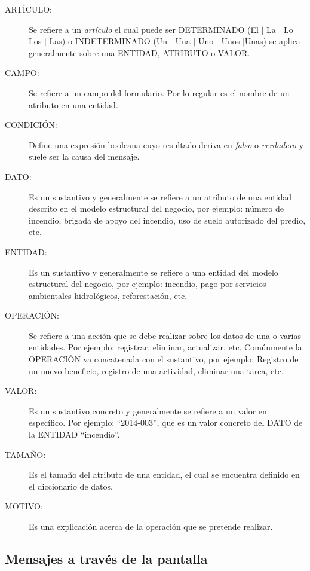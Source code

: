     \begin{description}
	\item [ARTÍCULO:] Se refiere a un {\em artículo} el cual puede ser DETERMINADO (El $\mid$ La $\mid$ Lo $\mid$ Los $\mid$ Las) o INDETERMINADO (Un $\mid$ Una $\mid$ 
	Uno $\mid$ Unos $\mid$Unas) se aplica generalmente sobre una ENTIDAD, ATRIBUTO o VALOR.
	\item [CAMPO:] Se refiere a un campo del formulario. Por lo regular es el nombre de un atributo en una entidad.
	\item [CONDICIÓN:] Define una expresión booleana cuyo resultado deriva en {\em falso} o {\em verdadero} y suele ser la causa del mensaje.
	\item [DATO:] Es un sustantivo y generalmente se refiere a un atributo de una entidad descrito en el modelo estructural del negocio, por ejemplo: número de incendio,
	brigada de apoyo del incendio, uso de suelo autorizado del predio, etc. %
	\item [ENTIDAD:] Es un sustantivo y generalmente se refiere a una entidad del modelo estructural del negocio, por ejemplo: incendio, pago por servicios ambientales hidrológicos, reforestación, etc.
	\item [OPERACIÓN:] Se refiere a una acción que se debe realizar sobre los datos de una o varias entidades. Por ejemplo: registrar, eliminar, actualizar, etc. Comúnmente 
	la OPERACIÓN va concatenada con el sustantivo, por ejemplo: Registro de un nuevo beneficio, registro de una actividad, eliminar una tarea, etc.
	\item [VALOR:] Es un sustantivo concreto y generalmente se refiere a un valor en específico. Por ejemplo: ``2014-003'', que es un valor concreto del DATO de la 
	ENTIDAD ``incendio''.
	\item [TAMAÑO:] Es el tamaño del atributo de una entidad, el cual se encuentra definido en el diccionario de datos.
	\item [MOTIVO:] Es una explicación acerca de la operación que se pretende realizar.
    \end{description}


\subsection{Mensajes a través de la pantalla}

